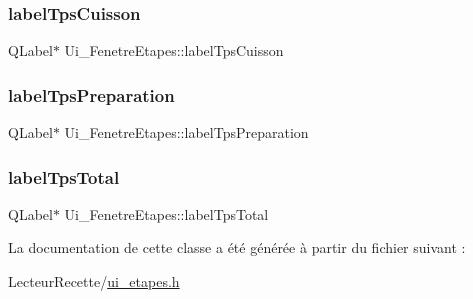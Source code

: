 \subsubsection{\texorpdfstring{label\+Tps\+Cuisson}{labelTpsCuisson}}
{\footnotesize\ttfamily Q\+Label$\ast$ Ui\+\_\+\+Fenetre\+Etapes\+::label\+Tps\+Cuisson}

\mbox{\label{class_ui___fenetre_etapes_ab1994c36dbf7f67f539517c6431cb96b}} 
\subsubsection{\texorpdfstring{label\+Tps\+Preparation}{labelTpsPreparation}}
{\footnotesize\ttfamily Q\+Label$\ast$ Ui\+\_\+\+Fenetre\+Etapes\+::label\+Tps\+Preparation}

\mbox{\label{class_ui___fenetre_etapes_a3c1c06d0dd2dde35c651ad430dc04bda}} 
\subsubsection{\texorpdfstring{label\+Tps\+Total}{labelTpsTotal}}
{\footnotesize\ttfamily Q\+Label$\ast$ Ui\+\_\+\+Fenetre\+Etapes\+::label\+Tps\+Total}



La documentation de cette classe a été générée à partir du fichier suivant \+:\begin{DoxyCompactItemize}
\item 
Lecteur\+Recette/\hyperlink{ui__etapes_8h}{ui\+\_\+etapes.\+h}\end{DoxyCompactItemize}
